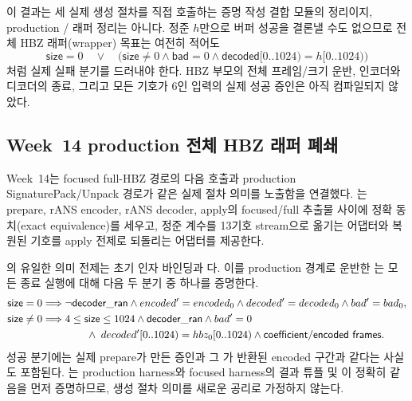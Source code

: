 이 결과는 세 실제 생성 절차를 직접 호출하는 증명 작성 결합 모듈의 정리이지,
production /
래퍼 정리는 아니다. 정준 \(h\)만으로 버퍼 성공을 결론낼 수도 없으므로 전체
HBZ 래퍼(wrapper) 목표는 여전히 적어도
\[
  \mathsf{size}=0\quad\lor\quad
  \bigl(\mathsf{size}\ne0\land
        \mathsf{bad}=0\land
        \mathsf{decoded}[0..1024)=h[0..1024)\bigr)
\]
처럼 실제 실패 분기를 드러내야 한다. HBZ 부모의 전체 프레임/크기 운반,
인코더와 디코더의 종료, 그리고 모든 기호가 6인 입력의 실제 성공 증인은 아직
컴파일되지 않았다.

\subsection{Week~14 production 전체 HBZ 래퍼 폐쇄}

Week~14는 focused full-HBZ 경로의
 다음
 호출과 production SignaturePack/Unpack 경로가
같은 실제 절차 의미를 노출함을 연결했다.
는 prepare, rANS encoder,
rANS decoder, apply의 focused/full 추출물 사이에 정확 동치(exact
equivalence)를 세우고, 정준 계수를 13기호 stream으로 옮기는 어댑터와 복원된
기호를 apply 전제로 되돌리는 어댑터를 제공한다.

의 유일한 의미 전제는
초기 인자 바인딩과 다. 이를 production
경계로 운반한
는 모든 종료 실행에
대해 다음 두 분기 중 하나를 증명한다.
\[
\begin{aligned}
  \mathsf{size}=0
    &\Longrightarrow \neg\mathsf{decoder\_ran}
      \land encoded'=encoded_0
      \land decoded'=decoded_0
      \land bad'=bad_0,\\
  \mathsf{size}\ne0
    &\Longrightarrow 4\le\mathsf{size}\le1024
      \land\mathsf{decoder\_ran}
      \land bad'=0\\
    &\hspace{4.2em}\land\;
      decoded'[0..1024)=hbz_0[0..1024)
      \land\mathsf{coefficient/encoded\ frames}.
\end{aligned}
\]
성공 분기에는 실제 prepare가 만든  증인과 그
가 반환된 encoded 구간과 같다는 사실도 포함된다.
는 production harness와
focused harness의 결과 튜플 및 이 정확히 같음을 먼저
증명하므로, 생성 절차 의미를 새로운 공리로 가정하지 않는다.


